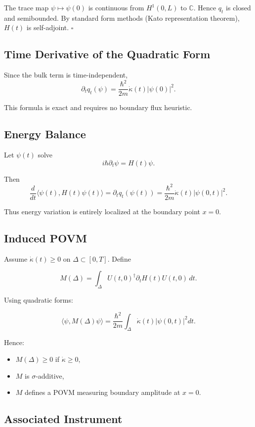 \documentclass[11pt,a4paper]{article}
\begin{document}
The trace map $\psi\mapsto\psi(0)$ is continuous from $H^1(0,L)$ to $\mathbb C$.
Hence $q_t$ is closed and semibounded.
By standard form methods (Kato representation theorem),
$H(t)$ is self-adjoint.
\hfill$\square$

\subsection{Time Derivative of the Quadratic Form}

Since the bulk term is time-independent,
\[
\partial_t q_t(\psi)
=
\frac{\hbar^2}{2m}
\dot\kappa(t)
|\psi(0)|^2.
\]

This formula is exact and requires no boundary flux heuristic.

\subsection{Energy Balance}

Let $\psi(t)$ solve
\[
i\hbar \partial_t \psi = H(t)\psi.
\]

Then
\[
\frac{d}{dt}
\langle \psi(t), H(t)\psi(t) \rangle
=
\partial_t q_t(\psi(t))
=
\frac{\hbar^2}{2m}
\dot\kappa(t)
|\psi(0,t)|^2.
\]

Thus energy variation is entirely localized at the boundary point $x=0$.

\subsection{Induced POVM}

Assume $\dot\kappa(t)\ge 0$ on $\Delta\subset[0,T]$.
Define

\[
M(\Delta)
=
\int_\Delta
U(t,0)^\dagger
\partial_t H(t)
U(t,0)\, dt.
\]

Using quadratic forms:

\[
\langle \psi, M(\Delta)\psi\rangle
=
\frac{\hbar^2}{2m}
\int_\Delta
\dot\kappa(t)
|\psi(0,t)|^2 dt.
\]

Hence:

\begin{itemize}
\item $M(\Delta)\ge 0$ if $\dot\kappa\ge 0$,
\item $M$ is $\sigma$-additive,
\item $M$ defines a POVM measuring boundary amplitude at $x=0$.
\end{itemize}

\subsection{Associated Instrument}
\end{document}
